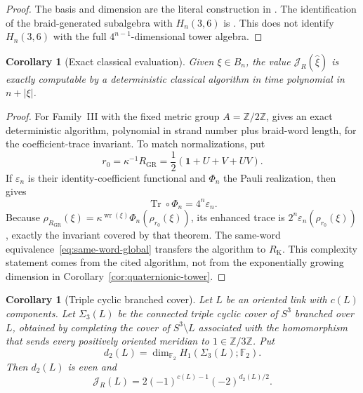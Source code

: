 \documentclass[11pt]{article}
\newtheorem{corollary}[theorem]{Corollary}
\theoremstyle{remark}
\newcommand{\Id}{\mathbf 1}
\newcommand{\Tr}{\operatorname{Tr}}
\begin{document}
\begin{proof}
The basis and dimension are the literal construction in
\cite[\S13.1]{GalindoRowell2026}.  The identification of the braid-generated
subalgebra with \(H_n(3,6)\) is
\cite[Lemma~3.2, p.~176]{Rowell2011}.  This does not identify
\(H_n(3,6)\) with the full \(4^{n-1}\)-dimensional tower algebra.
\end{proof}

\begin{corollary}[Exact classical evaluation]\label{cor:algorithm}
Given \(\xi\in B_n\), the value \(\mathcal J_R(\widehat\xi)\) is exactly
computable by a deterministic classical algorithm in time polynomial in
\(n+|\xi|\).
\end{corollary}

\begin{proof}
For Family~III with the fixed metric group \(A=\mathbb Z/2\mathbb Z\),
\cite[Theorem~7.10]{GalindoRowell2026} gives an exact deterministic algorithm,
polynomial in strand number plus braid-word length, for the coefficient-trace
invariant.  To match normalizations, put
\[
  r_0=\kappa^{-1}R_{\mathrm{GR}}
  =\frac12(\Id+U+V+UV).
\]
If \(\varepsilon_n\) is their identity-coefficient functional and \(\Phi_n\)
the Pauli realization, then \cite[Theorem~7.3]{GalindoRowell2026} gives
\[
  \Tr\!\circ\!\Phi_n=4^n\varepsilon_n.
\]
Because \(\rho_{R_{\mathrm{GR}}}(\xi)
=\kappa^{\operatorname{wr}(\xi)}\Phi_n(\rho_{r_0}(\xi))\), its enhanced trace
is \(2^n\varepsilon_n(\rho_{r_0}(\xi))\), exactly the invariant covered by
that theorem.  The same-word equivalence~\eqref{eq:same-word-global} transfers
the algorithm to \(R_{\mathrm K}\).  This complexity statement comes from the
cited algorithm, not from the exponentially growing dimension in
Corollary~\ref{cor:quaternionic-tower}.
\end{proof}

\begin{corollary}[Triple cyclic branched cover]\label{cor:branched-cover}
Let \(L\) be an oriented link with \(c(L)\) components.  Let
\(\Sigma_3(L)\) be the connected triple cyclic cover of \(S^3\) branched over
\(L\), obtained by completing the cover of \(S^3\setminus L\) associated with
the homomorphism that sends every positively oriented meridian to
\(1\in\mathbb Z/3\mathbb Z\).  Put
\[
  d_2(L)=\dim_{\mathbb F_2}H_1(\Sigma_3(L);\mathbb F_2).
\]
Then \(d_2(L)\) is even and
\begin{equation}
  \mathcal J_R(L)=2(-1)^{c(L)-1}(-2)^{d_2(L)/2}.
  \label{eq:branched-cover}
\end{equation}
\end{corollary}
\end{document}
